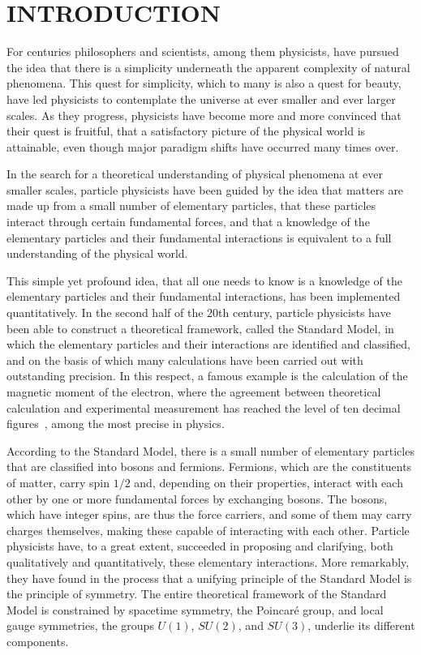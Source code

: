 \chapter{INTRODUCTION}

For centuries philosophers and scientists, among them physicists, have pursued
the idea that there is a simplicity underneath the apparent complexity of
natural phenomena. This quest for simplicity, which to many is also a quest for
beauty, have led physicists to contemplate the universe at ever smaller and
ever larger scales. As they progress, physicists have become more and more
convinced that their quest is fruitful, that a satisfactory picture of the
physical world is attainable, even though major paradigm shifts have occurred
many times over.

In the search for a theoretical understanding of physical phenomena at ever
smaller scales, particle physicists have been guided by the idea that matters
are made up from a small number of elementary particles, that these particles
interact through certain fundamental forces, and that a knowledge of the
elementary particles and their fundamental interactions is equivalent to a full
understanding of the physical world.

This simple yet profound idea, that all one needs to know is a knowledge of the
elementary particles and their fundamental interactions, has been implemented
quantitatively. In the second half of the $20$th century, particle physicists
have been able to construct a theoretical framework, called the Standard Model,
in which the elementary particles and their interactions are identified and
classified, and on the basis of which many calculations have been carried out
with outstanding precision. In this respect, a famous example is the
calculation of the magnetic moment of the electron, where the agreement between
theoretical calculation and experimental measurement has reached the level of
ten decimal figures~\cite{electronmoment}, among the most precise in physics.

According to the Standard Model, there is a small number of elementary
particles that are classified into bosons and fermions. Fermions, which are the
constituents of matter, carry spin $1/2$ and, depending on their properties,
interact with each other by one or more fundamental forces by exchanging
bosons. The bosons, which have integer spins, are thus the force carriers, and
some of them may carry charges themselves, making these capable of interacting
with each other. Particle physicists have, to a great extent, succeeded in
proposing and clarifying, both qualitatively and quantitatively, these
elementary interactions. More remarkably, they have found in the process that a
unifying principle of the Standard Model is the principle of symmetry. The
entire theoretical framework of the Standard Model is constrained by spacetime
symmetry, the Poincar\'{e} group, and local gauge symmetries, the groups
$U(1)$, $SU(2)$, and $SU(3)$, underlie its different components.

